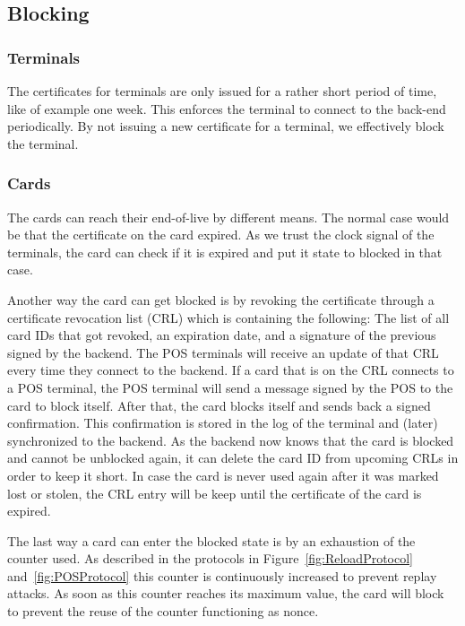 \subsection{Blocking}
\subsubsection{Terminals}
The certificates for terminals are only issued for a rather short period of time, like of example one week.
This enforces the terminal to connect to the back-end periodically.
By not issuing a new certificate for a terminal, we effectively block the terminal.

\subsubsection{Cards}
The cards can reach their end-of-live by different means.
The normal case would be that the certificate on the card expired.
As we trust the clock signal of the terminals, the card can check if it is expired and put it state to blocked in that case.

Another way the card can get blocked is by revoking the certificate through a certificate revocation list (CRL) which is containing the following:
The list of all card IDs that got revoked, an expiration date, and a signature of the previous signed by the backend.
The POS terminals will receive an update of that CRL every time they connect to the backend.
If a card that is on the CRL connects to a POS terminal, the POS terminal will send a message signed by the POS to the card to block itself.
After that, the card blocks itself and sends back a signed confirmation.
This confirmation is stored in the log of the terminal and (later) synchronized to the backend.
As the backend now knows that the card is blocked and cannot be unblocked again, it can delete the card ID from upcoming CRLs in order to keep it short.
In case the card is never used again after it was marked lost or stolen, the CRL entry will be keep until the certificate of the card is expired.


The last way a card can enter the blocked state is by an exhaustion of the counter used.
As described in the protocols in Figure~\ref{fig:ReloadProtocol} and~\ref{fig:POSProtocol} this counter is continuously increased to prevent replay attacks.
As soon as this counter reaches its maximum value, the card will block to prevent the reuse of the counter functioning as nonce.

